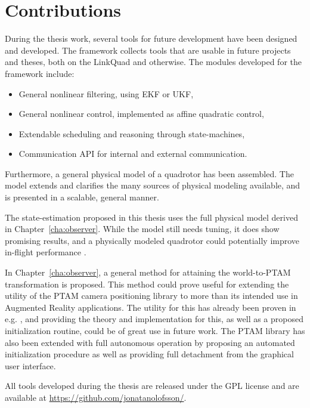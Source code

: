\section{Contributions}
    During the thesis work, several tools for future development have been
    designed and developed. The \crap framework collects tools that are usable in future
    projects and theses, both on the LinkQuad and otherwise.
    The modules developed for the \crap framework include:
    \begin{itemize}
        \item General nonlinear filtering, using EKF or UKF,
        \item General nonlinear control, implemented as affine quadratic control,
        \item Extendable scheduling and reasoning through state-machines,
        \item Communication API for internal and external communication.
    \end{itemize}

    Furthermore, a general physical model of a quadrotor has been assembled.
    The model extends and clarifies the many sources of physical modeling
    available, and is presented in a scalable, general manner.

    The state-estimation proposed in this thesis uses the full physical model
    derived in Chapter~\ref{cha:observer}. While the model still needs
    tuning, it does show promising results, and a physically modeled
    quadrotor could potentially improve in-flight performance \citep{bouabdallah07full}.

    In Chapter~\ref{cha:observer}, a general method for attaining
    the world-to-PTAM transformation is proposed.
    This method could prove useful for extending the utility of the PTAM
    camera positioning library to more than its intended use in Augmented Reality applications.
    The utility for this has already been proven in e.g. \citep{weiss11monocular},
    and providing the theory and implementation for this, as well as a proposed
    initialization routine, could be of great use in future work.
    The PTAM library has also been extended with full autonomous operation by
    proposing an automated initialization procedure as well as providing
    full detachment from the graphical user interface.

    All tools developed during the thesis are released under the GPL license
    and are available at \url{https://github.com/jonatanolofsson/}.

